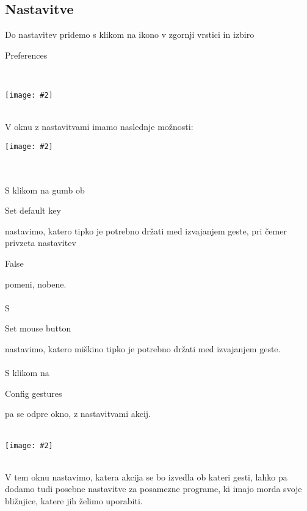 \documentclass[10pt,a4paper,oneside]{book}
\newcommand\inline[1]{%
\begin{Sbox}{#1}\end{Sbox}%
\colorbox{lightgray}{\TheSbox}%
}
\newcommand\pic[2]{%
\parbox{1cm}{%
\begin{center}%
\texttt{[image: \#2]}%
\end{center}%
}%
}
\newcommand\br{%
 \ \\ \ \\%
}
\begin{document}
\subsection{Nastavitve}\label{Nastavitve}
Do nastavitev pridemo s klikom na ikono v zgornji vrstici in izbiro \inline{Preferences}\\
\pic{0.9}{./gmsAppindicator.png}\\
V oknu z nastavitvami imamo naslednje možnosti:\\
\pic{0.5}{./gmsSettings.png}
\br
S klikom na gumb ob \inline{Set default key} nastavimo, katero tipko je potrebno držati med izvajanjem geste, pri čemer privzeta nastavitev \inline{False} pomeni, nobene.
\br
S \inline{Set mouse button} nastavimo, katero miškino tipko je potrebno držati med izvajanjem geste.
\br
S klikom na \inline{Config gestures} pa se odpre okno, z nastavitvami akcij.\br
\pic{0.9}{./gmsKeys2.png}\\
V tem oknu nastavimo, katera akcija se bo izvedla ob kateri gesti, lahko pa dodamo tudi posebne nastavitve za posamezne programe, ki imajo morda svoje bližnjice, katere jih želimo uporabiti.
\end{document}
